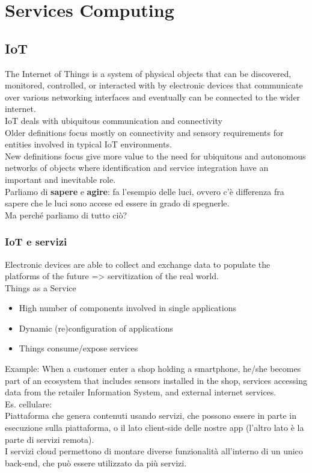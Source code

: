 \chapter{Services Computing}
\section{IoT}
The Internet of Things is a system of physical objects that can be discovered, monitored, controlled, or interacted with by electronic devices that communicate over various networking interfaces and eventually can be connected to the wider internet.
\\IoT deals with ubiquitous communication and connectivity
\\Older definitions focus mostly on connectivity and sensory requirements for entities involved in typical IoT environments.
\\New definitions focus give more value to the need for ubiquitous and autonomous networks of objects where identification and service integration have an important and inevitable role.
\\Parliamo di \textbf{sapere} e \textbf{agire}: fa l'esempio delle luci, ovvero c'è differenza fra sapere che le luci sono accese ed essere in grado di spegnerle.
\\Ma perché parliamo di tutto ciò?

\subsection{IoT e servizi}
Electronic devices are able to collect and exchange data to populate the platforms of the future => servitization of the real world.
\\Things as a Service
\begin{itemize}
    \item High number of components involved in single applications
    \item Dynamic (re)configuration of applications
    \item Things consume/expose services
\end{itemize}
Example: When a customer enter a shop holding a smartphone, he/she becomes part of an ecosystem that includes sensors installed in the shop, services accessing data from the retailer Information System, and external internet services.
\\Es. cellulare:
\\Piattaforma che genera contenuti usando servizi, che possono essere in parte in esecuzione sulla piattaforma, o il lato client-side delle nostre app (l'altro lato è la parte di servizi remota).
\\I servizi cloud permettono di montare diverse funzionalità all'interno di un unico back-end, che può essere utilizzato da più servizi.

